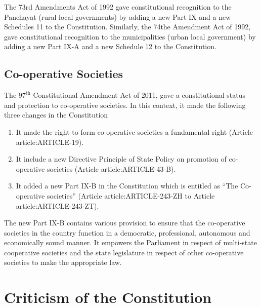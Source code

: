 \begin{multicol}{2}
The 73rd Amendments Act of 1992 gave constitutional recognition to the Panchayat (rural local governments) by adding a new Part IX and a new Schedules 11 to the Constitution. Similarly, the 74the Amendment Act of 1992, gave constitutional recognition to the municipalities (urban local government) by adding a new Part IX-A and a new Schedule 12 to the Constitution.

\subsection{Co-operative Societies}

The $97^{\text{th}}$ Constitutional Amendment Act of 2011, gave a constitutional status and protection to co-operative societies. In this context, it made the following three changes in the Constitution

\begin{enumerate}
  \item It made the right to form co-operative societies a fundamental right (Article \gls{article:ARTICLE-19}).
  \item It include a new Directive Principle of State Policy on promotion of co-operative societies (Article \gls{article:ARTICLE-43-B}).
  \item It added a new Part IX-B in the Constitution which is entitled as ``The Co-operative societies'' (Article \gls{article:ARTICLE-243-ZH} to Article \gls{article:ARTICLE-243-ZT}).
\end{enumerate}

The new Part IX-B contains various provision to ensure that the co-operative societies in the country function in a democratic, professional, autonomous and economically sound manner. It empowers the Parliament in respect of multi-state cooperative societies and the state legislature in respect of other co-operative societies to make the appropriate law.

\section{Criticism of the Constitution}


\end{multicol}
